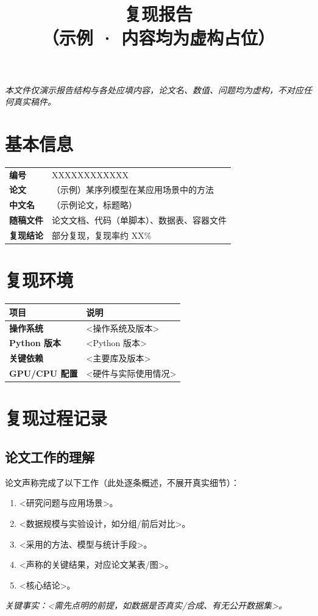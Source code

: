 \documentclass[11pt]{article}
\title{\Huge 复现报告\\[2mm]\large （示例 · 内容均为虚构占位）}\date{}
\begin{document}
\maketitle\thispagestyle{fancy}

\begin{center}\itshape\small
本文件仅演示报告结构与各处应填内容，论文名、数值、问题均为虚构，不对应任何真实稿件。
\end{center}
\medskip

\section{基本信息}
\begin{center}\begin{tabular}{>{\bfseries}l p{11cm}}
\toprule
编号    & XXXXXXXXXXXX \\
论文    & （示例）某序列模型在某应用场景中的方法 \\
中文名  & （示例论文，标题略） \\
随稿文件 & 论文文档、代码（单脚本）、数据表、容器文件 \\
复现结论 & 部分复现，复现率约 XX\% \\
\bottomrule
\end{tabular}\end{center}

\section{复现环境}
\begin{center}\begin{tabular}{>{\bfseries}l p{10cm}}
\toprule
项目 & 说明 \\ \midrule
操作系统     & <操作系统及版本> \\
Python 版本  & <Python 版本> \\
关键依赖     & <主要库及版本> \\
GPU/CPU 配置 & <硬件与实际使用情况> \\
\bottomrule
\end{tabular}\end{center}

\section{复现过程记录}

\subsection{论文工作的理解}
论文声称完成了以下工作（此处逐条概述，不展开真实细节）：
\begin{enumerate}[leftmargin=2em]
  \item <研究问题与应用场景>。
  \item <数据规模与实验设计，如分组/前后对比>。
  \item <采用的方法、模型与统计手段>。
  \item <声称的关键结果，对应论文某表/图>。
  \item <核心结论>。
\end{enumerate}
\noindent\textit{关键事实：<需先点明的前提，如数据是否真实/合成、有无公开数据集>。}
\end{document}
